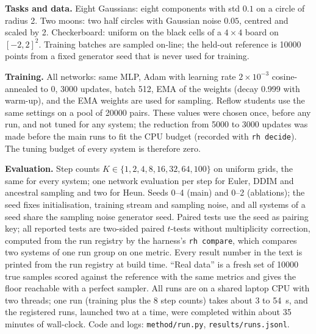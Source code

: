 \textbf{Tasks and data.} Eight Gaussians: eight components with std $0.1$ on a circle of radius 2. Two moons: two half circles with Gaussian noise $0.05$, centred and scaled by 2. Checkerboard: uniform on the black cells of a $4\times4$ board on $[-2,2]^2$. Training batches are sampled on-line; the held-out reference is 10000 points from a fixed generator seed that is never used for training.

\textbf{Training.} All networks: same MLP, Adam with learning rate $2\times10^{-3}$ cosine-annealed to 0, 3000 updates, batch 512, EMA of the weights (decay 0.999 with warm-up), and the EMA weights are used for sampling. Reflow students use the same settings on a pool of 20000 pairs. These values were chosen once, before any run, and not tuned for any system; the reduction from 5000 to 3000 updates was made before the main runs to fit the CPU budget (recorded with \texttt{rh decide}). The tuning budget of every system is therefore zero.

\textbf{Evaluation.} Step counts $K\in\{1,2,4,8,16,32,64,100\}$ on uniform grids, the same for every system; one network evaluation per step for Euler, DDIM and ancestral sampling and two for Heun. Seeds 0--4 (main) and 0--2 (ablations); the seed fixes initialisation, training stream and sampling noise, and all systems of a seed share the sampling noise generator seed. Paired tests use the seed as pairing key; all reported tests are two-sided paired $t$-tests without multiplicity correction, computed from the run registry by the harness's \texttt{rh compare}, which compares two systems of one run group on one metric. Every result number in the text is printed from the run registry at build time. ``Real data'' is a fresh set of 10000 true samples scored against the reference with the same metrics and gives the floor reachable with a perfect sampler. All runs are on a shared laptop CPU with two threads; one run (training plus the 8 step counts) takes about 3 to 54~s, and the registered runs, launched two at a time, were completed within about 35 minutes of wall-clock. Code and logs: \texttt{method/run.py}, \texttt{results/runs.jsonl}.
